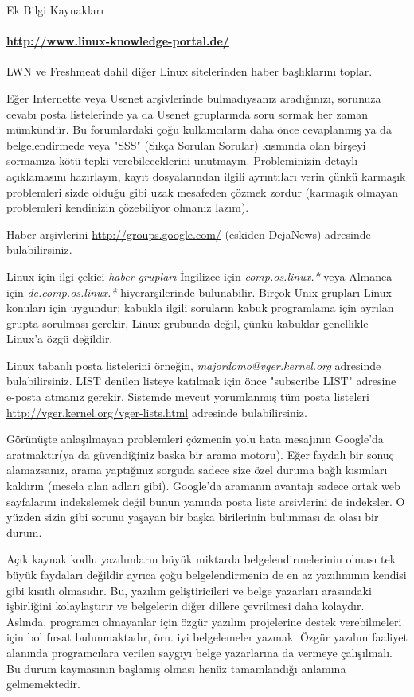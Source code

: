 \begin{section}{Ek Bilgi Kaynakları}
\paragraph{\url{http://www.linux-knowledge-portal.de/}}{LWN ve Freshmeat dahil diğer Linux sitelerinden haber başlıklarını toplar.}

Eğer Internette veya Usenet arşivlerinde bulmadıysanız aradığınızı, sorunuza cevabı  posta listelerinde ya da Usenet gruplarında soru sormak her zaman mümkündür. Bu forumlardaki çoğu kullanıcıların daha önce cevaplanmış ya da belgelendirmede veya "SSS" (Sıkça Sorulan Sorular) kısmında olan birşeyi sormanıza kötü tepki verebileceklerini unutmayın. Probleminizin detaylı açıklamasını hazırlayın, kayıt dosyalarından ilgili ayrıntıları verin çünkü karmaşık problemleri sizde olduğu gibi uzak mesafeden çözmek zordur (karmaşık olmayan problemleri kendinizin çözebiliyor olmanız lazım).

Haber arşivlerini \url{http://groups.google.com/} (eskiden DejaNews) adresinde bulabilirsiniz.

Linux için ilgi çekici \emph{haber grupları} İngilizce için \emph{comp.os.linux.*} veya Almanca için \emph{de.comp.os.linux.*} hiyerarşilerinde bulunabilir. Birçok Unix grupları Linux konuları için uygundur; kabukla ilgili soruların kabuk programlama için ayrılan grupta sorulması gerekir, Linux grubunda değil, çünkü kabuklar genellikle Linux'a özgü değildir.

Linux tabanlı posta listelerini örneğin, \emph{majordomo@vger.kernel.org} adresinde bulabilirsiniz. LIST denilen listeye katılmak için önce "subscribe LIST" adresine e-posta atmanız gerekir. Sistemde mevcut yorumlanmış tüm posta listeleri \url{http://vger.kernel.org/vger-lists.html} adresinde bulabilirsiniz.

Görünüşte anlaşılmayan problemleri çözmenin yolu hata mesajının Google'da aratmaktır(ya da güvendiğiniz baska bir arama motoru). Eğer faydalı bir sonuç alamazsanız, arama yaptığınız sorguda sadece size özel duruma bağlı kısımları kaldırın (mesela alan adları gibi). Google'da aramanın avantajı sadece ortak web sayfalarını indekslemek değil bunun yanında posta liste arsivlerini de indeksler. O yüzden sizin gibi sorunu yaşayan bir başka birilerinin bulunması da olası bir durum.

Açık kaynak kodlu yazılımların büyük miktarda belgelendirmelerinin olması tek büyük faydaları değildir ayrıca çoğu belgelendirmenin de en az yazılımının kendisi gibi kısıtlı olmasıdır. Bu, yazılım geliştiricileri ve belge yazarları arasındaki işbirliğini kolaylaştırır ve belgelerin diğer dillere çevrilmesi daha kolaydır. Aslında, programcı olmayanlar için özgür yazılım projelerine destek verebilmeleri için bol fırsat bulunmaktadır, örn. iyi belgelemeler yazmak. Özgür yazılım faaliyet alanında programcılara verilen saygıyı belge yazarlarına da vermeye çalışılmalı. Bu durum kaymasının başlamış olması henüz tamamlandığı anlamına gelmemektedir.
\end{section}
